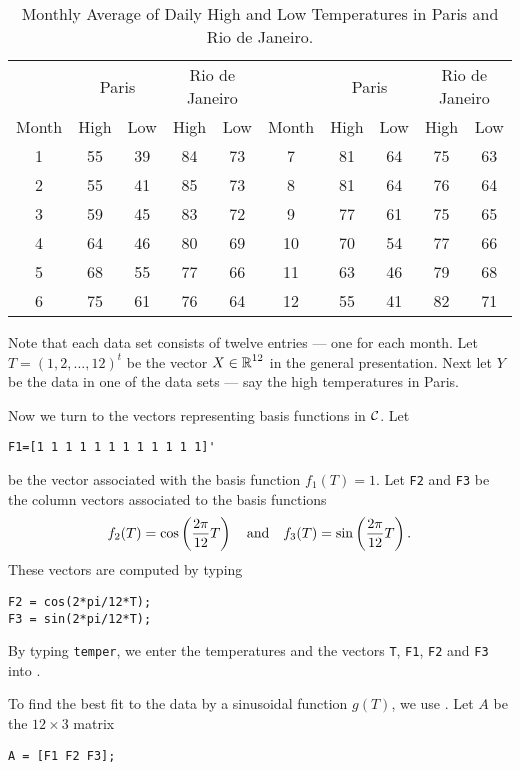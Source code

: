 \documentclass{ximera}
\begin{document}
\begin{table}[htb]
\begin{center}
\begin{tabular}{|c||c|c||c|c|||c||c|c||c|c|}
\hline
  & \multicolumn{2}{c||}{Paris} & \multicolumn{2}{c|||}{Rio de Janeiro} &
  & \multicolumn{2}{c||}{Paris} & \multicolumn{2}{c|}{Rio de Janeiro}\\
Month & High & Low & High & Low & Month & High & Low & High & Low\\
\hline
  1 & 55 & 39 & 84 & 73 &   7 & 81 & 64 & 75 & 63 \\
  2 & 55 & 41 & 85 & 73 &   8 & 81 & 64 & 76 & 64 \\
  3 & 59 & 45 & 83 & 72 &   9 & 77 & 61 & 75 & 65 \\
  4 & 64 & 46 & 80 & 69 &  10 & 70 & 54 & 77 & 66 \\
  5 & 68 & 55 & 77 & 66 &  11 & 63 & 46 & 79 & 68 \\
  6 & 75 & 61 & 76 & 64 &  12 & 55 & 41 & 82 & 71 \\
\hline
\end{tabular}
\caption{Monthly Average of Daily High and Low Temperatures in Paris and Rio de
Janeiro.}
\label{T:parrio}
\end{center}
\end{table}

Note that each data set consists of twelve entries --- one for each month.
Let $T=(1,2,\ldots,12)^t$ be the vector $X\in\mbox{$\Bbb{R}$}^{12}$ in the general
presentation.  Next let $Y$ be the data in one of the data sets --- say the
high temperatures in Paris.

Now we turn to the vectors representing basis functions in ${\cal C}$.
Let
\begin{verbatim}
F1=[1 1 1 1 1 1 1 1 1 1 1 1]'
\end{verbatim}
be the vector associated with the basis function $f_1(T)=1$. Let  {\tt F2}
and {\tt F3} be the column vectors associated to the basis functions
\[
f_2(T) = \cos\left(\frac{2\pi}{12} T\right) \quad\mbox{and}\quad
f_3(T) = \sin\left(\frac{2\pi}{12} T\right).
\]
These vectors are computed by typing
\begin{verbatim}
F2 = cos(2*pi/12*T);
F3 = sin(2*pi/12*T);
\end{verbatim}
By typing {\tt temper}, we enter the temperatures and the vectors {\tt T},
{\tt F1},  {\tt F2} and {\tt F3} into \Matlabp.

To find the best fit to the data by a sinusoidal function $g(T)$, we use
.  Let $A$ be the $12\times 3$ matrix
\begin{verbatim}
A = [F1 F2 F3];
\end{verbatim}
\end{document}
